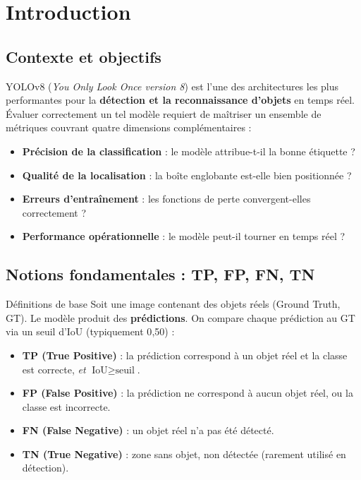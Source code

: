 \documentclass[12pt, a4paper]{report}
\newcommand{\IoU}{\text{IoU}}
\begin{document}
\chapter{Introduction}

\section{Contexte et objectifs}

YOLOv8 (\textit{You Only Look Once version 8}) est
l'une des architectures les plus performantes pour la \textbf{détection et la
reconnaissance d'objets} en temps réel. Évaluer correctement un tel modèle
requiert de maîtriser un ensemble de métriques couvrant quatre dimensions
complémentaires :

\begin{itemize}
  \item \textbf{Précision de la classification} : le modèle attribue-t-il la
        bonne étiquette ?
  \item \textbf{Qualité de la localisation} : la boîte englobante est-elle bien
        positionnée ?
  \item \textbf{Erreurs d'entraînement} : les fonctions de perte convergent-elles
        correctement ?
  \item \textbf{Performance opérationnelle} : le modèle peut-il tourner en temps
        réel ?
\end{itemize}

\section{Notions fondamentales : TP, FP, FN, TN}

\begin{definitionbox}{Définitions de base}
  Soit une image contenant des objets réels (Ground Truth, GT).
  Le modèle produit des \textbf{prédictions}. On compare chaque prédiction au GT
  via un seuil d'IoU (typiquement 0{,}50) :
  \begin{itemize}
    \item \textbf{TP (True Positive)} : la prédiction correspond à un objet réel
          et la classe est correcte, \textit{et} $\IoU \geq \text{seuil}$.
    \item \textbf{FP (False Positive)} : la prédiction ne correspond à aucun objet
          réel, ou la classe est incorrecte.
    \item \textbf{FN (False Negative)} : un objet réel n'a pas été détecté.
    \item \textbf{TN (True Negative)} : zone sans objet, non détectée (rarement
          utilisé en détection).
  \end{itemize}
\end{definitionbox}
\end{document}
